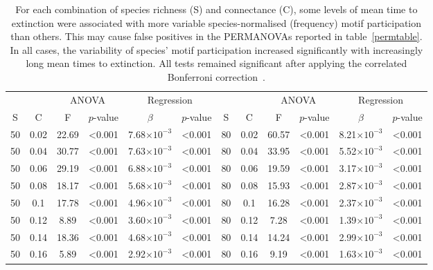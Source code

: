 \documentclass[12pt]{article}
\begin{document}
\begin{spacing}{2.0}
		\begin{table}[h!]
			\caption{For each combination of species richness (S) and connectance (C), some levels of mean time to extinction were associated with more variable species-normalised (frequency) motif participation than others. This may cause false positives in the PERMANOVAs reported in table~\ref{permtable}. In all cases, the variability of species' motif participation increased significantly with increasingly long mean times to extinction. All tests remained significant after applying the correlated Bonferroni correction~\citep{Drezner2016}.}
			\label{betadisp_freq}
			\footnotesize
			\begin{tabular}{c c | c c| c c ||c c | c c | c c |}
        &&\multicolumn{2}{c|}{ANOVA}&\multicolumn{2}{c||}{Regression}&&&\multicolumn{2}{c|}{ANOVA}&\multicolumn{2}{c|}{Regression}\\
        S&C&F&$p$-value&$\beta$&$p$-value&S&C&F&$p$-value&$\beta$&$p$-value\\
        \hline
        50  & 0.02  & 22.69 & \textless0.001  & 7.68$\times10^{-3}$ & \textless0.001  & 80  & 0.02  & 60.57 & \textless0.001  & 8.21$\times10^{-3}$ & \textless0.001  \\
        50  & 0.04  & 30.77 & \textless0.001  & 7.63$\times10^{-3}$ & \textless0.001  & 80  & 0.04  & 33.95 & \textless0.001  & 5.52$\times10^{-3}$ & \textless0.001  \\
        50  & 0.06  & 29.19 & \textless0.001  & 6.88$\times10^{-3}$ & \textless0.001  & 80  & 0.06  & 19.59 & \textless0.001  & 3.17$\times10^{-3}$ & \textless0.001  \\
        50  & 0.08  & 18.17 & \textless0.001  & 5.68$\times10^{-3}$ & \textless0.001  & 80  & 0.08  & 15.93 & \textless0.001  & 2.87$\times10^{-3}$ & \textless0.001  \\
        50  & 0.1 & 17.78 & \textless0.001  & 4.96$\times10^{-3}$ & \textless0.001  & 80  & 0.1 & 16.28 & \textless0.001  & 2.37$\times10^{-3}$ & \textless0.001  \\
        50  & 0.12  & 8.89  & \textless0.001  & 3.60$\times10^{-3}$ & \textless0.001  & 80  & 0.12  & 7.28  & \textless0.001  & 1.39$\times10^{-3}$ & \textless0.001  \\
        50  & 0.14  & 18.36 & \textless0.001  & 4.68$\times10^{-3}$ & \textless0.001  & 80  & 0.14  & 14.24 & \textless0.001  & 2.99$\times10^{-3}$ & \textless0.001  \\
        50  & 0.16  & 5.89  & \textless0.001  & 2.92$\times10^{-3}$ & \textless0.001  & 80  & 0.16  & 9.19  & \textless0.001  & 1.63$\times10^{-3}$ & \textless0.001  \\

\end{tabular}
\end{table}
\end{spacing}
\end{document}
